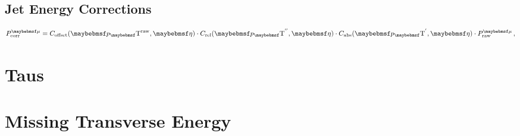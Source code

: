 \subsection{Jet Energy Corrections}


\begin{equation}
P_{\text{corr}}^{\mu} = C_{\text{offset}}(\pT^{\text{raw}},\eta) \cdot C_{\text{rel}}(\pT^{''},\eta) \cdot C_{\text{abs}}(\pT^{'},\eta) \cdot P_{\text{raw}}^{\mu}\, ,
\end{equation}

\cite{ARTICLE:CMSDeterminationJetEnergyCalibration}

\cite{ARTICLE:PileupSubtractionJetAreas}

\section{Taus}

\section{Missing Transverse Energy}

\cite{ARTICLE:CMSMissingTransverseEnergyPerformance}

\cite{ARTICLE:CMSMETPerformance8TeV}

